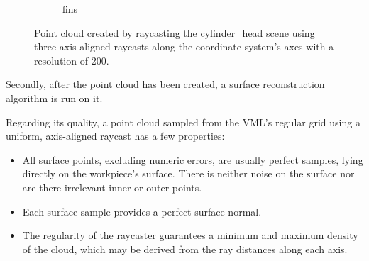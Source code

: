 \begin{figure}
\begin{subfigure}[t]{0.49\textwidth}
		\caption{fins}
		\label{fig:cylinder_head_point_cloud_fins}
	\end{subfigure}
	\caption{
		Point cloud created by raycasting the cylinder\_head scene using three axis-aligned raycasts along the coordinate system's axes with a resolution of 200.
	}
	\label{fig:cylinder_head_point_cloud}
\end{figure}
%
Secondly, after the point cloud has been created, a surface reconstruction algorithm is run on it.

Regarding its quality, a point cloud sampled from the VML's regular grid using a uniform, axis-aligned raycast has a few properties:
\begin{itemize}
	\item
	All surface points, excluding numeric errors, are usually perfect samples, lying directly on the workpiece's surface.
	There is neither noise on the surface nor are there irrelevant inner or outer points.
	\item
	Each surface sample provides a perfect surface normal.
	\item
	The regularity of the raycaster guarantees a minimum and maximum density of the cloud, which may be derived from the ray distances along each axis.
\end{itemize}

